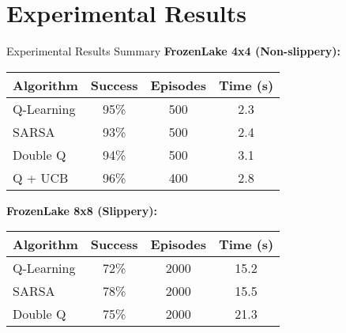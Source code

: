 \documentclass[aspectratio=169,10pt]{beamer}
\begin{document}
\section{Experimental Results}

\begin{frame}{Experimental Results Summary}
\textbf{FrozenLake 4x4 (Non-slippery):}
\begin{center}
\begin{tabular}{|l|c|c|c|}
\hline
\textbf{Algorithm} & \textbf{Success} & \textbf{Episodes} & \textbf{Time (s)} \\
\hline
Q-Learning & 95\% & 500 & 2.3 \\
SARSA & 93\% & 500 & 2.4 \\
Double Q & 94\% & 500 & 3.1 \\
Q + UCB & 96\% & 400 & 2.8 \\
\hline
\end{tabular}
\end{center}

\textbf{FrozenLake 8x8 (Slippery):}
\begin{center}
\begin{tabular}{|l|c|c|c|}
\hline
\textbf{Algorithm} & \textbf{Success} & \textbf{Episodes} & \textbf{Time (s)} \\
\hline
Q-Learning & 72\% & 2000 & 15.2 \\
SARSA & 78\% & 2000 & 15.5 \\
Double Q & 75\% & 2000 & 21.3 \\
\hline
\end{tabular}
\end{center}
\end{frame}
\end{document}
